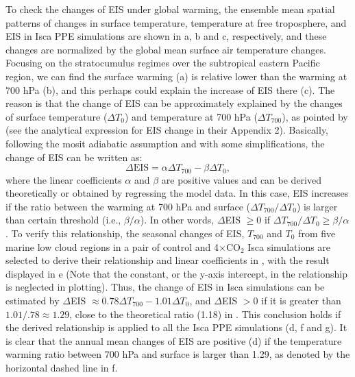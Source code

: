 To check the changes of EIS under global warming, the ensemble mean spatial patterns of changes in surface temperature, temperature at free troposphere, and EIS in Isca PPE simulations are shown in a, b and c, respectively, and these changes are normalized by the global mean surface air temperature changes. Focusing on the stratocumulus regimes over the subtropical eastern Pacific region, we can find the surface warming (a) is relative lower than the warming at 700 hPa (b), and this perhaps could explain the increase of EIS there (c). The reason is that the change of EIS can be approximately explained by the changes of surface temperature ($\Delta T_0$) and temperature at 700 hPa ($\Delta T_{700}$), as pointed by \cite{Qu2014} (see the analytical expression for EIS change in their Appendix 2). Basically, following the mosit adiabatic assumption and with some simplifications, the change of EIS can be written as:
\begin{equation}
    \Delta\text{EIS} =\alpha \Delta T_{700} - \beta \Delta T_0,
    \label{eq:eis_change_T0_T700}
\end{equation}
where the linear coefficients $\alpha$ and $\beta$ are positive values and can be derived theoretically or obtained by regressing the model data. In this case, EIS increases if the ratio between the warming at 700 hPa and surface ($\Delta T_{700}/\Delta T_0$) is larger than certain threshold (i.e., $\beta/\alpha$). In other words, $\Delta$EIS $\geq 0$ if $\Delta T_{700}/\Delta T_0\geq \beta/\alpha$. To verify this relationship, the seasonal changes of EIS, $T_{700}$ and $T_{0}$ from five marine low cloud regions \citep{Klein1993,Qu2014} in a pair of control and 4$\times$CO$_2$ Isca simulations are selected to derive their relationship and linear coefficients in , with the result displayed in e (Note that the constant, or the y-axis intercept, in the relationship is neglected in plotting). Thus, the change of EIS in Isca simulations can be estimated by $\Delta$EIS $\approx 0.78\Delta T_{700} - 1.01\Delta T_0$, and $\Delta$EIS $>0$ if it is greater than $1.01/.78\approx1.29$, close to the theoretical ratio (1.18) in \cite{Qu2014}. This conclusion holds if the derived relationship is applied to all the Isca PPE simulations (d, f and g). It is clear that the annual mean changes of EIS are positive (d) if the temperature warming ratio between 700 hPa and surface is larger than 1.29, as denoted by the horizontal dashed line in f. 

